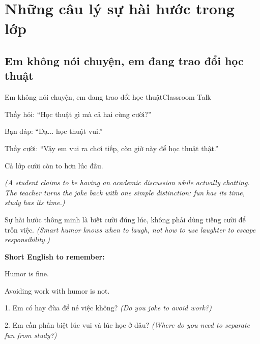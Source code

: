 \chapter{Những câu lý sự hài hước trong lớp}

\section{Em không nói chuyện, em đang trao đổi học thuật}
\begin{truyen}{Em không nói chuyện, em đang trao đổi học thuật}{Classroom Talk}

Thầy hỏi: ``Học thuật gì mà cả hai cùng cười?''

Bạn đáp: ``Dạ... học thuật vui.''

Thầy cười: ``Vậy em vui ra chơi tiếp, còn giờ này để học thuật thật.''

Cả lớp cười còn to hơn lúc đầu.

\textit{(A student claims to be having an academic discussion while actually chatting. The teacher turns the joke back with one simple distinction: fun has its time, study has its time.)}
\end{truyen}

\begin{baihoc}
Sự hài hước thông minh là biết cười đúng lúc, không phải dùng tiếng cười để trốn việc.
\textit{(Smart humor knows when to laugh, not how to use laughter to escape responsibility.)}
\end{baihoc}

\begin{ghinhoanh}
\textbf{Short English to remember:}

Humor is fine.

Avoiding work with humor is not.
\end{ghinhoanh}

\begin{tuhocnhanh}
1. Em có hay đùa để né việc không? \textit{(Do you joke to avoid work?)}

2. Em cần phân biệt lúc vui và lúc học ở đâu? \textit{(Where do you need to separate fun from study?)}
\end{tuhocnhanh}
\ngancach

